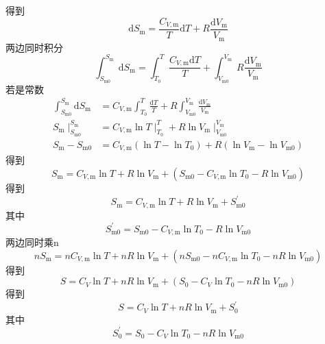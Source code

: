 得到
\begin{equation}
    \mathrm{d}S_{\mathrm{m}}=\frac{C_{V,\mathrm{m}}}{T}\mathrm{d}T+R\frac{\mathrm{d}V_{\mathrm{m}}}{V_{\mathrm{m}}}
\end{equation}
两边同时积分
\begin{equation}
    \int_{S_{\mathrm{m}0}}^{S_{\mathrm{m}}}{\mathrm{d}S_{\mathrm{m}}}=\int_{T_0}^T{\frac{C_{V,\mathrm{m}}\mathrm{d}T}{T}}+\int_{V_{\mathrm{m}0}}^{V_{\mathrm{m}}}{R\frac{\mathrm{d}V_{\mathrm{m}}}{V_{\mathrm{m}}}}
\end{equation}
若是常数
\begin{equation}
    \begin{aligned}
        \int_{S_{\mathrm{m}0}}^{S_{\mathrm{m}}}{\mathrm{d}S_{\mathrm{m}}}&=C_{V,\mathrm{m}}\int_{T_0}^T{\frac{\mathrm{d}T}{T}}+R\int_{V_{\mathrm{m}0}}^{V_{\mathrm{m}}}{\frac{\mathrm{d}V_{\mathrm{m}}}{V_{\mathrm{m}}}}
\\
S_{\mathrm{m}}\mid_{S_{\mathrm{m}0}}^{S_{\mathrm{m}}}&=C_{V,\mathrm{m}}\ln T\mid_{T_0}^{T}+R\ln V_{\mathrm{m}}\mid_{V_{\mathrm{m}0}}^{V_{\mathrm{m}}}
\\
S_{\mathrm{m}}-S_{\mathrm{m}0}&=C_{V,\mathrm{m}}\left( \ln T-\ln T_0 \right) +R\left( \ln V_{\mathrm{m}}-\ln V_{\mathrm{m}0} \right) 
    \end{aligned}
\end{equation}
得到
\begin{equation}
    S_{\mathrm{m}}=C_{V,\mathrm{m}}\ln T+R\ln V_{\mathrm{m}}+\left( S_{\mathrm{m}0}-C_{V,\mathrm{m}}\ln T_0-R\ln V_{\mathrm{m}0} \right) 
\end{equation}
得到
\begin{equation}
    S_{\mathrm{m}}=C_{V,\mathrm{m}}\ln T+R\ln V_{\mathrm{m}}+S_{\mathrm{m}0}^{\prime}
\end{equation}
其中
\begin{equation}
    S_{\mathrm{m}0}^{\prime}=S_{\mathrm{m}0}-C_{V,\mathrm{m}}\ln T_0-R\ln V_{\mathrm{m}0}
\end{equation}
两边同时乘n
\begin{equation}
    nS_{\mathrm{m}}=nC_{V,\mathrm{m}}\ln T+nR\ln V_{\mathrm{m}}+\left( nS_{\mathrm{m}0}-nC_{V,\mathrm{m}}\ln T_0-nR\ln V_{\mathrm{m}0} \right) 
\end{equation}
得到
\begin{equation}
    S=C_V\ln T+nR\ln V_{\mathrm{m}}+\left( S_0-C_V\ln T_0-nR\ln V_{\mathrm{m}0} \right) 
\end{equation}
得到
\begin{equation}
    S=C_V\ln T+nR\ln V_{\mathrm{m}}+S_{0}^{\prime}
\end{equation}
其中
\begin{equation}
    S_{0}^{\prime}=S_0-C_V\ln T_0-nR\ln V_{\mathrm{m}0}
\end{equation}


